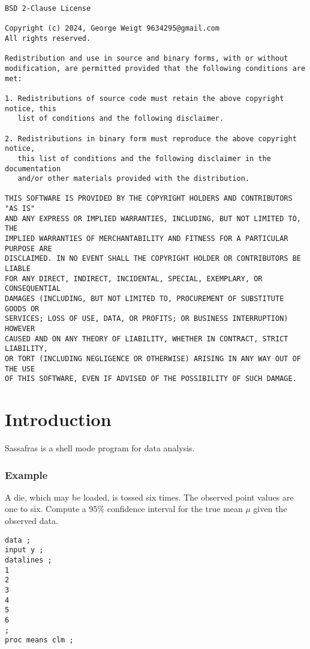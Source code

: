 \documentclass[12pt]{article}
\begin{document}
\tableofcontents
\newpage
{\footnotesize\begin{verbatim}
BSD 2-Clause License

Copyright (c) 2024, George Weigt 9634295@gmail.com
All rights reserved.

Redistribution and use in source and binary forms, with or without
modification, are permitted provided that the following conditions are met:

1. Redistributions of source code must retain the above copyright notice, this
   list of conditions and the following disclaimer.

2. Redistributions in binary form must reproduce the above copyright notice,
   this list of conditions and the following disclaimer in the documentation
   and/or other materials provided with the distribution.

THIS SOFTWARE IS PROVIDED BY THE COPYRIGHT HOLDERS AND CONTRIBUTORS "AS IS"
AND ANY EXPRESS OR IMPLIED WARRANTIES, INCLUDING, BUT NOT LIMITED TO, THE
IMPLIED WARRANTIES OF MERCHANTABILITY AND FITNESS FOR A PARTICULAR PURPOSE ARE
DISCLAIMED. IN NO EVENT SHALL THE COPYRIGHT HOLDER OR CONTRIBUTORS BE LIABLE
FOR ANY DIRECT, INDIRECT, INCIDENTAL, SPECIAL, EXEMPLARY, OR CONSEQUENTIAL
DAMAGES (INCLUDING, BUT NOT LIMITED TO, PROCUREMENT OF SUBSTITUTE GOODS OR
SERVICES; LOSS OF USE, DATA, OR PROFITS; OR BUSINESS INTERRUPTION) HOWEVER
CAUSED AND ON ANY THEORY OF LIABILITY, WHETHER IN CONTRACT, STRICT LIABILITY,
OR TORT (INCLUDING NEGLIGENCE OR OTHERWISE) ARISING IN ANY WAY OUT OF THE USE
OF THIS SOFTWARE, EVEN IF ADVISED OF THE POSSIBILITY OF SUCH DAMAGE.
\end{verbatim}}
\newpage

\section{Introduction}

Sassafras is a shell mode program for data analysis.

\subsubsection*{Example}

A die, which may be loaded, is tossed six times.
The observed point values are one to six.
Compute a 95\% confidence interval for the true mean $\mu$
given the observed data.

{\footnotesize\begin{verbatim}
data ;
input y ;
datalines ;
1
2
3
4
5
6
;
proc means clm ;
\end{verbatim}}
\end{document}
